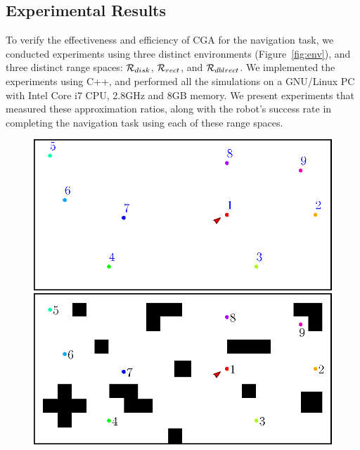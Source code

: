 \subsection{Experimental Results}
\label{subsec:exp}
To verify the effectiveness and efficiency of CGA for the navigation task, we
conducted experiments using three distinct environments
(Figure~\ref{fig:env}), and three distinct range spaces: $\mathcal{R}_{disk}$,
$\mathcal{R}_{rect}$, and $\mathcal{R}_{dblrect}$.  
%
We implemented the experiments using C++, and performed all the simulations on a GNU/Linux PC with Intel Core i7 CPU, 2.8GHz and 8GB memory.
We present experiments that measured these approximation ratios, 
along with the robot's success rate in completing the navigation task using each of these range spaces.
\begin{figure}
  \centering
  \begin{minipage}[b]{0.45\textwidth}
    \includegraphics[scale=0.65]{figs/blank}  \\ 
    \includegraphics[scale=0.65]{figs/clutter}  
  \end{minipage}
  \begin{minipage}[b]{0.45\textwidth}

\end{minipage}
\end{figure}
